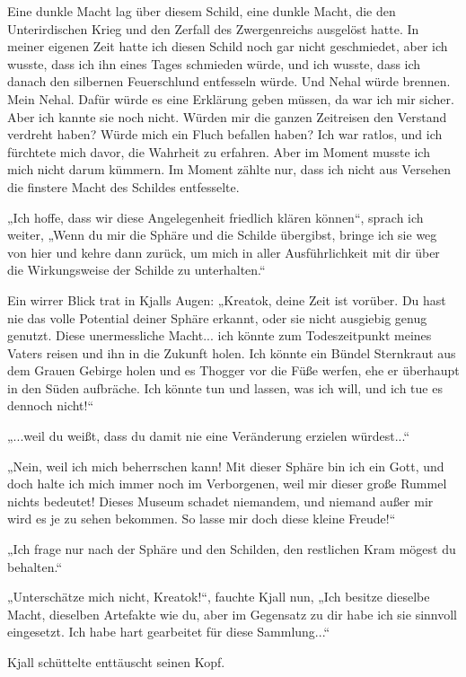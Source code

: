 Eine dunkle Macht lag über diesem Schild, eine dunkle Macht, die den Unterirdischen Krieg und den Zerfall des Zwergenreichs ausgelöst hatte. In meiner eigenen Zeit hatte ich diesen Schild noch gar nicht geschmiedet, aber ich wusste, dass ich ihn eines Tages schmieden würde, und ich wusste, dass ich danach den silbernen Feuerschlund entfesseln würde. Und Nehal würde brennen. Mein Nehal. Dafür würde es eine Erklärung geben müssen, da war ich mir sicher. Aber ich kannte sie noch nicht. Würden mir die ganzen Zeitreisen den Verstand verdreht haben? Würde mich ein Fluch befallen haben? Ich war ratlos, und ich fürchtete mich davor, die Wahrheit zu erfahren. Aber im Moment musste ich mich nicht darum kümmern. Im Moment zählte nur, dass ich nicht aus Versehen die finstere Macht des Schildes entfesselte.

„Ich hoffe, dass wir diese Angelegenheit friedlich klären können“, sprach ich weiter, „Wenn du mir die Sphäre und die Schilde übergibst, bringe ich sie weg von hier und kehre dann zurück, um mich in aller Ausführlichkeit mit dir über die Wirkungsweise der Schilde zu unterhalten.“

Ein wirrer Blick trat in Kjalls Augen: „Kreatok, deine Zeit ist vorüber. Du hast nie das volle Potential deiner Sphäre erkannt, oder sie nicht ausgiebig genug genutzt. Diese unermessliche Macht... ich könnte zum Todeszeitpunkt meines Vaters reisen und ihn in die Zukunft holen. Ich könnte ein Bündel Sternkraut aus dem Grauen Gebirge holen und es Thogger vor die Füße werfen, ehe er überhaupt in den Süden aufbräche. Ich könnte tun und lassen, was ich will, und ich tue es dennoch nicht!“

„...weil du weißt, dass du damit nie eine Veränderung erzielen würdest...“

„Nein, weil ich mich beherrschen kann! Mit dieser Sphäre bin ich ein Gott, und doch halte ich mich immer noch im Verborgenen, weil mir dieser große Rummel nichts bedeutet! Dieses Museum schadet niemandem, und niemand außer mir wird es je zu sehen bekommen. So lasse mir doch diese kleine Freude!“

„Ich frage nur nach der Sphäre und den Schilden, den restlichen Kram mögest du behalten.“

„Unterschätze mich nicht, Kreatok!“, fauchte Kjall nun, „Ich besitze dieselbe Macht, dieselben Artefakte wie du, aber im Gegensatz zu dir habe ich sie sinnvoll eingesetzt. Ich habe hart gearbeitet für diese Sammlung...“

Kjall schüttelte enttäuscht seinen Kopf.

